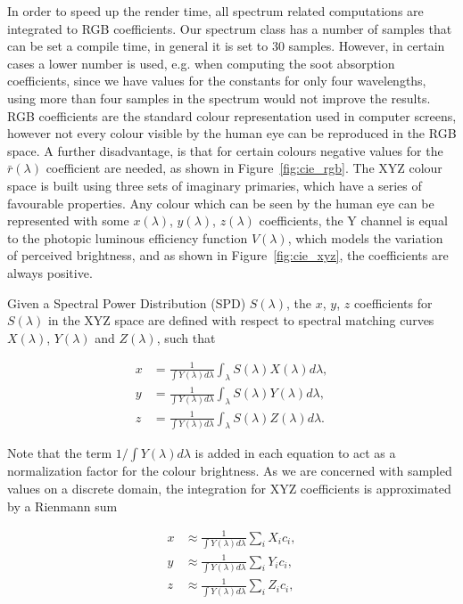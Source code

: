 In order to speed up the render time, all spectrum related computations are integrated to RGB coefficients.
Our spectrum class has a number of samples that can be set a compile time, in general it is set to 30 samples.
However, in certain cases a lower number is used, e.g. when computing the soot absorption coefficients, since we have values for the constants for only four wavelengths, using more than four samples in the spectrum would not improve the results.
RGB coefficients are the standard colour representation used in computer screens, however not every colour visible by the human eye can be reproduced in the RGB space.
A further disadvantage, is that for certain colours negative values for the $\bar{r}(\lambda)$ coefficient are needed, as shown in Figure~\ref{fig:cie_rgb}.
The XYZ colour space is built using three sets of imaginary primaries, which have a series of favourable properties.
Any colour which can be seen by the human eye can be represented with some $x(\lambda)$, $y(\lambda)$, $z(\lambda)$ coefficients, the Y channel is equal to the photopic luminous efficiency function $V(\lambda)$, which models the variation of perceived brightness, and as shown in Figure~\ref{fig:cie_xyz}, the coefficients are always positive.

Given a Spectral Power Distribution (SPD) $S(\lambda)$, the $x$, $y$, $z$ coefficients for $S(\lambda)$ in the XYZ space are defined with respect to spectral matching curves $X(\lambda)$, $Y(\lambda)$ and $Z(\lambda)$, such that

\begin{equation}
\begin{split}
x &= \frac{1}{\int Y(\lambda) d\lambda} \int_\lambda S(\lambda) X(\lambda) d\lambda, \\
y &= \frac{1}{\int Y(\lambda) d\lambda} \int_\lambda S(\lambda) Y(\lambda) d\lambda, \\
z &= \frac{1}{\int Y(\lambda) d\lambda} \int_\lambda S(\lambda) Z(\lambda) d\lambda.
\end{split}
\end{equation}

Note that the term $1 / \int Y(\lambda) d\lambda$ is added in each equation to act as a normalization factor for the colour brightness. 
As we are concerned with sampled values on a discrete domain, the integration for XYZ coefficients is approximated by a Rienmann sum

\begin{equation}
\begin{split}
x &\approx \frac{1}{\int Y(\lambda) d\lambda} \sum_i X_i c_i, \\
y &\approx \frac{1}{\int Y(\lambda) d\lambda} \sum_i Y_i c_i, \\
z &\approx \frac{1}{\int Y(\lambda) d\lambda} \sum_i Z_i c_i,
\end{split}
\end{equation}

